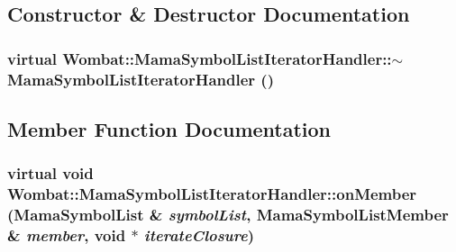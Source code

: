 \subsection{Constructor \& Destructor Documentation}
\hypertarget{classWombat_1_1MamaSymbolListIteratorHandler_a966643ab28fd12c6c2182cc5ba9cc1da}{
\subsubsection[{$\sim$MamaSymbolListIteratorHandler}]{\setlength{\rightskip}{0pt plus 5cm}virtual Wombat::MamaSymbolListIteratorHandler::$\sim$MamaSymbolListIteratorHandler ()}}
\label{classWombat_1_1MamaSymbolListIteratorHandler_a966643ab28fd12c6c2182cc5ba9cc1da}


\subsection{Member Function Documentation}
\hypertarget{classWombat_1_1MamaSymbolListIteratorHandler_a4473a13b92c04377588fe0178ad04dad}{
\subsubsection[{onMember}]{\setlength{\rightskip}{0pt plus 5cm}virtual void Wombat::MamaSymbolListIteratorHandler::onMember ({\bf MamaSymbolList} \& {\em symbolList}, \/  {\bf MamaSymbolListMember} \& {\em member}, \/  void $\ast$ {\em iterateClosure})}}
\label{classWombat_1_1MamaSymbolListIteratorHandler_a4473a13b92c04377588fe0178ad04dad}



